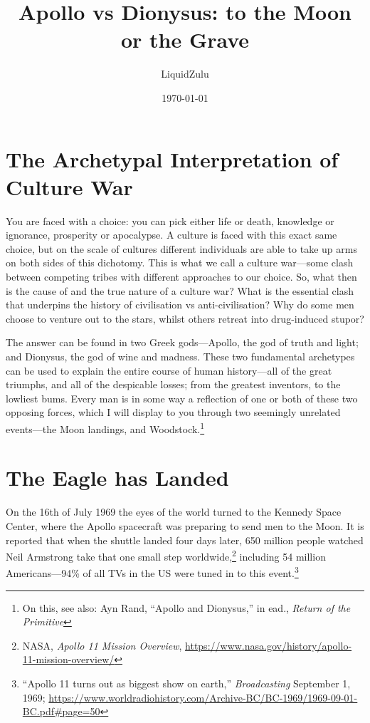 \documentclass[11pt]{article}
\author{LiquidZulu}
\date{\today}
\title{Apollo vs Dionysus: to the Moon or the Grave}
\begin{document}
\maketitle
\tableofcontents


\section{The Archetypal Interpretation of Culture War}
\label{sec:orgb2ccab2}
You are faced with a choice: you can pick either life or death, knowledge or ignorance, prosperity or apocalypse. A culture is faced with this exact same choice, but on the scale of cultures different individuals are able to take up arms on both sides of this dichotomy. This is what we call a culture war---some clash between competing tribes with different approaches to our choice. So, what then is the cause of and the true nature of a culture war? What is the essential clash that underpins the history of civilisation vs anti-civilisation? Why do some men choose to venture out to the stars, whilst others retreat into drug-induced stupor?

The answer can be found in two Greek gods---Apollo, the god of truth and light; and Dionysus, the god of wine and madness. These two fundamental archetypes can be used to explain the entire course of human history---all of the great triumphs, and all of the despicable losses; from the greatest inventors, to the lowliest bums. Every man is in some way a reflection of one or both of these two opposing forces, which I will display to you through two seemingly unrelated events---the Moon landings, and Woodstock.\footnote{On this, see also: Ayn Rand, ``Apollo and Dionysus,'' in ead., \emph{Return of the Primitive}}

\section{The Eagle has Landed}
\label{sec:org225a340}
On the 16th of July 1969 the eyes of the world turned to the Kennedy Space Center, where the Apollo spacecraft was preparing to send men to the Moon. It is reported that when the shuttle landed four days later, 650 million people watched Neil Armstrong take that one small step worldwide,\footnote{NASA, \emph{Apollo 11 Mission Overview}, \url{https://www.nasa.gov/history/apollo-11-mission-overview/}} including 54 million Americans---94\% of all TVs in the US were tuned in to this event.\footnote{``Apollo 11 turns out as biggest show on earth,'' \emph{Broadcasting} September 1, 1969; \url{https://www.worldradiohistory.com/Archive-BC/BC-1969/1969-09-01-BC.pdf\#page=50}}
\end{document}
